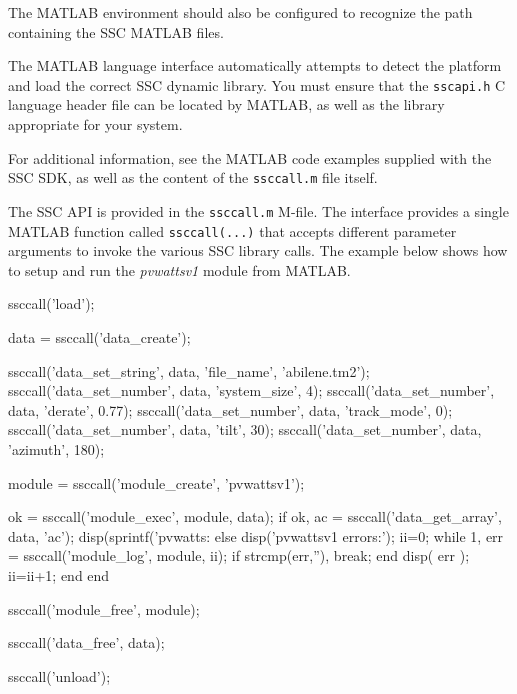\documentclass{scrartcl} %
\newcommand{\+}{\discretionary{\mbox{\scriptsize$\hookleftarrow$}}{}{}}
\begin{document}
The MATLAB environment should also be configured to recognize the path containing the SSC MATLAB files.

The MATLAB language interface automatically attempts to detect the platform and load the correct SSC dynamic library.  You must ensure that the \texttt{sscapi.h} C language header file can be located by MATLAB, as well as the library appropriate for your system.  

For additional information, see the MATLAB code examples supplied with the SSC SDK, as well as the content of the \texttt{ssccall.m} file itself.

The SSC API is provided in the \texttt{ssccall.m} M-file.  The interface provides a single MATLAB function called \texttt{ssccall(...)} that accepts different parameter arguments to invoke the various SSC library calls.  The example below shows how to setup and run the \emph{pvwattsv1} module from MATLAB.

\begin{verbatimtab}[4]
ssccall('load');

data = ssccall('data_create');

ssccall('data_set_string', data, 'file_name', 'abilene.tm2');
ssccall('data_set_number', data, 'system_size', 4);
ssccall('data_set_number', data, 'derate', 0.77);
ssccall('data_set_number', data, 'track_mode', 0);
ssccall('data_set_number', data, 'tilt', 30);
ssccall('data_set_number', data, 'azimuth', 180);

module = ssccall('module_create', 'pvwattsv1');

ok = ssccall('module_exec', module, data);
if ok,
    ac = ssccall('data_get_array', data, 'ac');
    disp(sprintf('pvwatts: %
else
    disp('pvwattsv1 errors:');
    ii=0;
    while 1,
        err = ssccall('module_log', module, ii);
        if strcmp(err,''),
            break;
        end
        disp( err );
        ii=ii+1;
    end
end

ssccall('module_free', module);

ssccall('data_free', data);

ssccall('unload');
\end{verbatimtab}
\end{document}
